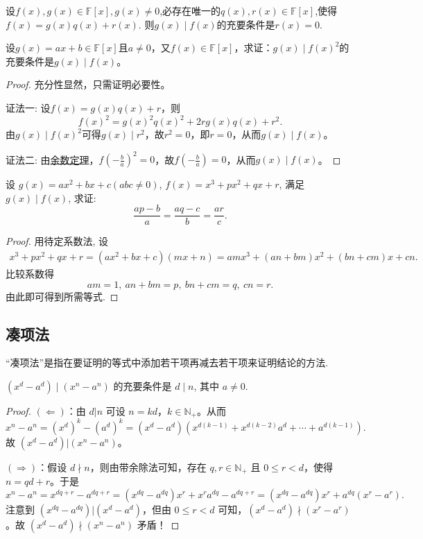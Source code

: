 \documentclass[lang=cn,newtx,10pt,scheme=chinese]{elegantbook}
\begin{document}
\begin{corollary}\label{corollary:整除关于多项式的带余除法的充要条件}
设\(f(x),g(x)\in\mathbb{F}[x],g(x)\neq 0\),必存在唯一的\(q(x),r(x)\in\mathbb{F}[x]\),使得$f(x)=g(x)q(x)+r(x)$. 
则\(g(x)\mid f(x)\)的充要条件是\(r(x)=0\).
\end{corollary}

\begin{example}
设\(g(x)=ax + b\in\mathbb{F}[x]\)且\(a\neq0\)，又\(f(x)\in\mathbb{F}[x]\)，求证：\(g(x)\mid f(x)^2\)的充要条件是\(g(x)\mid f(x)\)。
\end{example}
\begin{proof}
充分性显然，只需证明必要性。

{\color{blue}证法一:}
设\(f(x)=g(x)q(x)+r\)，则
\[
f(x)^2 = g(x)^2q(x)^2 + 2rg(x)q(x)+r^2.
\]
由\(g(x)\mid f(x)^2\)可得\(g(x)\mid r^2\)，故\(r^2 = 0\)，即\(r = 0\)，从而\(g(x)\mid f(x)\)。

{\color{blue}证法二:}
由\hyperref[theorem:余数定理]{余数定理}，\(f\left(-\frac{b}{a}\right)^2 = 0\)，故\(f\left(-\frac{b}{a}\right)= 0\)，从而\(g(x)\mid f(x)\)。
\end{proof}

\begin{example}
设 \(g(x)=ax^{2}+bx + c(abc\neq0)\), \(f(x)=x^{3}+px^{2}+qx + r\), 满足 \(g(x)\mid f(x)\), 求证:
\[
\frac{ap - b}{a}=\frac{aq - c}{b}=\frac{ar}{c}.
\]
\end{example}
\begin{proof}
用待定系数法, 设
\begin{align*}
x^{3}+px^{2}+qx + r=(ax^{2}+bx + c)(mx + n)
=amx^{3}+(an + bm)x^{2}+(bn + cm)x+cn.
\end{align*}
比较系数得
\[
am = 1,\ an + bm = p,\ bn + cm = q,\ cn = r.
\]
由此即可得到所需等式. 
\end{proof}

\subsection{凑项法}

“凑项法”是指在要证明的等式中添加若干项再减去若干项来证明结论的方法.

\begin{proposition}\label{proposition:n方差整除的充要条件}
\((x^{d}-a^{d}) \mid (x^{n}-a^{n})\) 的充要条件是 \(d\mid n\), 其中 \(a\neq0\).
\end{proposition}
\begin{proof}
$(\Leftarrow)$：由 \(d|n\) 可设 \(n = kd\)，\(k\in \mathbb{N}_+\)。从而
\[
x^n - a^n=(x^d)^k-(a^d)^k=(x^d - a^d)(x^{d(k - 1)}+x^{d(k - 2)}a^d+\cdots +a^{d(k - 1)}).
\]
故 \((x^d - a^d)|(x^n - a^n)\)。

\((\Rightarrow)\)：假设 \(d\nmid n\)，则由带余除法可知，存在 \(q, r\in \mathbb{N}_+\) 且 \(0\leqslant r < d\)，使得 \(n = qd + r\)。于是
\[
x^n - a^n=x^{dq + r}-a^{dq + r}=(x^{dq}-a^{dq})x^r+x^ra^{dq}-a^{dq + r}=(x^{dq}-a^{dq})x^r+a^{dq}(x^r - a^r).
\]
注意到 \((x^{dq}-a^{dq})|(x^d - a^d)\)，但由 \(0\leqslant r < d\) 可知，\((x^d - a^d)\nmid (x^r - a^r)\)。故 \((x^d - a^d)\nmid (x^n - a^n)\) 矛盾！
\end{proof}
\end{document}
